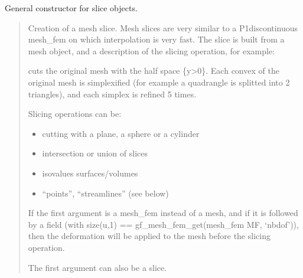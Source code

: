 \documentclass[a4paper,11pt,english]{sphinxmanual}
\begin{document}
General constructor for slice objects.
\begin{quote}

Creation of a mesh slice. Mesh slices are very similar to a
P1\sphinxhyphen{}discontinuous mesh\_fem on which interpolation is very fast. The slice is
built from a mesh object, and a description of the slicing operation, for
example:

\begin{sphinxVerbatim}[commandchars=\\\{\}]
  \PYG{p}{[}\PYG{p}{]}\PYG{p}{[}\PYG{p}{]}  
\end{sphinxVerbatim}

cuts the original mesh with the half space \{y\textgreater{}0\}. Each convex of the
original mesh  is simplexified (for example a quadrangle is splitted
into 2 triangles), and each simplex is refined 5 times.

Slicing operations can be:
\begin{itemize}
\item {} 
cutting with a plane, a sphere or a cylinder

\item {} 
intersection or union of slices

\item {} 
isovalues surfaces/volumes

\item {} 
“points”, “streamlines” (see below)

\end{itemize}

If the first argument is a mesh\_fem  instead of a mesh, and if it is
followed by a \sphinxhyphen{}field  (with size(u,1) ==
gf\_mesh\_fem\_get(mesh\_fem MF, ‘nbdof’)), then the deformation  will be applied to the
mesh before the slicing operation.

The first argument can also be a slice.
\end{quote}
\end{document}
